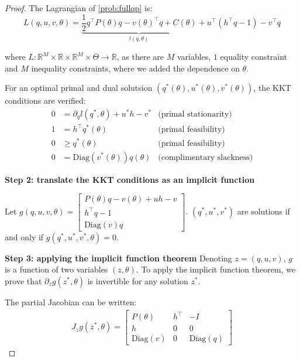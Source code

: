 \begin{proof}
The Lagrangian of \cref{prob:fullqp} is:
\begin{equation}
    L(q, u, v, \theta) = \underbrace{\frac{1}{2}q^\top P(\theta)q - v(\theta)^\top q + C(\theta)}_{l(q, \theta)}+ u^\top (h^\top q - 1) - v^\top q
\end{equation}

where $L: \mathbb R^M \times \mathbb R \times \mathbb R^M\times\Theta\to\mathbb R$, as there are $M$ variables, $1$ equality constraint and $M$ inequality constraints, where we added the dependence on $\theta$.

For an optimal primal and dual solutsion $(q^*(\theta), u^*(\theta), v^*(\theta))$, the KKT conditions are verified:
\begin{align}
    0 &= \partial_q l(q^*, \theta) + u^*h - v^* &\text{(primal stationarity)}\\
    1 & =h^\top q^*(\theta)  & \text{(primal feasibility)} \\
    0 & \geq q^*(\theta) & \text{(primal feasibility)}\\
    0 & = \mathrm{Diag}(v^*(\theta))q(\theta) & \text{(complimentary slackness)}
\end{align}






\textbf{Step 2: translate the KKT conditions as an implicit function}

Let $g(q, u, v, \theta) = \begin{bmatrix}
    P(\theta)q - v(\theta) + uh - v\\
    h^\top q- 1\\
    \mathrm{Diag}(v)q
\end{bmatrix}$. $(q^*, u^*, v^*)$ are solutions if and only if $g(q^*, u^*, v^*, \theta) = 0$.

\textbf{Step 3: applying the implicit function theorem}
Denoting $z = (q, u, v)$, $g$ is a function of two variables $(z, \theta)$. To apply the implicit function theorem, we prove that $\partial_z g(z^*, \theta)$ is invertible for any solution $z^*$.

The partial Jacobian can be written:
\begin{align}
    J_z g(z^*, \theta) = \begin{bmatrix}
    P(\theta) & h^\top  & - I\\
    h & 0 & 0\\
    \mathrm{Diag}(v)& 0 & \mathrm{Diag}(q)
    \end{bmatrix}
\end{align}


\end{proof}
